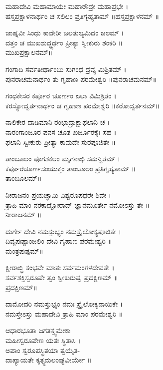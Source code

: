 ಮಹಾದೇವಿ ಮಹಾಮಾಯೇ ಮಹಾರೌದ್ರೇ ಮಹಾಪ್ರಭೇ ।\\
ಹಸ್ತಪ್ರಕ್ಷಾಳನಾರ್ಥಂ ಚ ಸಲಿಲಂ ಪ್ರತಿಗೃಹ್ಯತಾಮ್ ॥ಹಸ್ತಪ್ರಕ್ಷಾಳನಮ್ ॥

ಜಾಹ್ನವೀ ಸಿಂಧು ಕಾವೇರೀ ಜಲತುಲ್ಯಮಿದಂ ಜಲಮ್ ।\\
ದತ್ತಂ ಚ ಮುಖಶುದ್ಧ್ಯರ್ಥಂ ಪ್ರೀತ್ಯಾ ಸ್ವೀಕುರು ಶಂಕರಿ ॥\\ಮುಖಪ್ರಕ್ಷಾಲನಮ್॥

ಗಂಗಾದಿ ಸರ್ವತೀರ್ಥಾಂಬು ಸುಗಂಧ ದ್ರವ್ಯ ಮಿಶ್ರಿತಮ್ ।\\
ಪುನರಾಚಮನಾರ್ಥಂ ತು ಗೃಹಾಣ ಪರಮೇಶ್ವರಿ ॥ಪುನರಾಚಮನಮ್॥

ಗಂಧಕೇಸರ ಕರ್ಪೂರ ಚೂರ್ಣಂ ಏಲಾ ವಿಮಿಶ್ರಿತಂ ।\\
ಕರಸ್ಯೋದ್ವರ್ತನಾರ್ಥಂ ಚ ಗೃಹಾಣ ಪರಮೇಶ್ವರಿ ॥ಕರೋದ್ವರ್ತನಮ್॥

ನಾಲಿಕೇರ ದಾಡಿಮಾನಿ ರಂಭಾದ್ರಾಕ್ಷಾಫಲಾನಿ ಚ ।\\
ನಾರಂಗಾಂಜೂರ ಪನಸ ಚೂತ ಖರ್ಜೂರಕೈಃ ಸಹ ।\\
ಫಲಾನಿ ಸ್ವೀಕುರು ಪ್ರೀತ್ಯಾ ಕಾಮದೇ ಸುರಪೂಜಿತೇ ॥

ತಾಂಬೂಲಂ ಪೂಗಶಕಲಂ ಮೃಗನಾಭಿ ಸಮನ್ವಿತಮ್ ।\\
ಕರ್ಪೂರಚೂರ್ಣಸಂಯುಕ್ತಂ ತಾಂಬೂಲಂ ಪ್ರತಿಗೃಹ್ಯತಾಮ್ ॥\\ತಾಂಬೂಲಮ್॥

ನೀರಾಜನಂ ಪ್ರಯಚ್ಛಾಮಿ ವಿಶ್ವರೂಪಧರೇ ಶಿವೇ ।\\
ತ್ರಾಹಿ ಮಾಂ ನರಕಾದ್ಘೋರಾದ್ ಜ್ಞಾನಮೂರ್ತೇ ನಮೋಽಸ್ತು ತೇ ॥\\
ನೀರಾಜನಮ್ ॥

ದುರ್ಗೇ ದೇವಿ ನಮಸ್ತುಭ್ಯಂ ನಮಸ್ತ್ರೈಲೋಕ್ಯಪೂಜಿತೇ ।\\
ದಿವ್ಯಪುಷ್ಪಾಂಜಲಿಂ ದೇವಿ ಗೃಹಾಣ ಪರಮೇಶ್ವರಿ ॥\\
ಮಂತ್ರಪುಷ್ಪಮ್॥

ಕ್ಷೀರಾಬ್ಧಿ ಸಂಭವೇ ಮಾತಃ ಸರ್ವಮಂಗಳದೇವತೇ ।\\
ಸರ್ವಶಕ್ತಿಸ್ವರೂಪೇ ತ್ವಂ ಸ್ವೀಕುರುಷ್ವ ಪ್ರದಕ್ಷಿಣಮ್ ॥\\
ಪ್ರದಕ್ಷಿಣಮ್॥

ದಾಮೋದರಿ ನಮಸ್ತುಭ್ಯಂ ನಮಃ ಸ್ತ್ರೈಲೋಕ್ಯನಾಯಿಕೇ ।\\
ನಮಸ್ತೇಽಸ್ತು ಮಹಾದೇವಿ ತ್ರಾಹಿ ಮಾಂ ಪರಮೇಶ್ವರಿ ॥

ಆಧಾರಭೂತಾ ಜಗತಸ್ತ್ವಮೇಕಾ\\
        ಮಹೀಸ್ವರೂಪೇಣ ಯತಃ ಸ್ಥಿತಾಸಿ ।\\
ಅಪಾಂ ಸ್ವರೂಪಸ್ಥಿತಯಾ ತ್ವಯೈತ-\\
      ದಾಪ್ಯಾಯತೇ ಕೃತ್ಸ್ನಮಲಂಘ್ಯವೀರ್ಯೇ ॥


